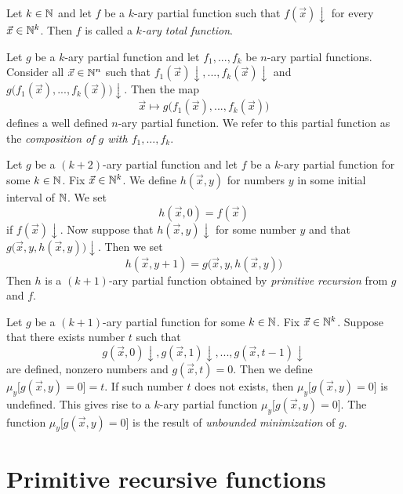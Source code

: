 \documentclass[10pt]{amsart}
\begin{document}
\begin{definition}
	Let $k\in {\mathbb N}$ and let $f$ be a $k$-ary partial function such that $f(\vec{x})\downarrow$ for every $\vec{x} \in {\mathbb N}^k$. Then $f$ is called a \textit{$k$-ary total function}.
\end{definition}

\begin{definition}
	Let $g$ be a $k$-ary partial function and let $f_1,...,f_k$ be $n$-ary partial functions. Consider all $\vec{x} \in {\mathbb N}^n$ such that $f_1(\vec{x})\downarrow,...,f_k(\vec{x})\downarrow$ and $g\big(f_1(\vec{x}),...,f_k(\vec{x})\big)\downarrow$. Then the map
	$$\vec{x} \mapsto g\big(f_1(\vec{x}),...,f_k(\vec{x})\big)$$
	defines a well defined $n$-ary partial function. We refer to this partial function as the \textit{composition of $g$ with $f_1,...,f_k$}.
\end{definition}

\begin{definition}
	Let $g$ be a $(k + 2)$-ary partial function and let $f$ be a $k$-ary partial function for some $k \in {\mathbb N}$. Fix $\vec{x} \in {\mathbb N}^k$. We define $h(\vec{x},y)$ for numbers $y$ in some initial interval of ${\mathbb N}$. We set
	$$h(\vec{x},0) = f(\vec{x})$$
	if $f(\vec{x})\downarrow$. Now suppose that $h(\vec{x},y)\downarrow$ for some number $y$ and that $g\big(\vec{x}, y, h\left(\vec{x},y\right)\big)\downarrow$. Then we set
	$$h(\vec{x}, y + 1) = g\big(\vec{x}, y, h\left(\vec{x},y\right)\big)$$
	Then $h$ is a $(k+1)$-ary partial function obtained by \textit{primitive recursion} from $g$ and $f$.
\end{definition}

\begin{definition}
	Let $g$ be a $(k + 1)$-ary partial function for some $k \in {\mathbb N}$. Fix $\vec{x} \in {\mathbb N}^k$. Suppose that there exists number $t$ such that
	$$g\left(\vec{x},0\right)\downarrow,g\left(\vec{x},1\right)\downarrow,...,g\left(\vec{x},t - 1\right)\downarrow$$
	are defined, nonzero numbers and $g(\vec{x},t) = 0$. Then we define $\mu_y \big[g\left(\vec{x},y\right) = 0\big] = t$. If such number $t$ does not exists, then $\mu_y \big[g\left(\vec{x},y\right) = 0\big]$ is undefined. This gives rise to a $k$-ary partial function $\mu_y \big[g(\vec{x}, y) = 0\big]$. The function $\mu_y \big[g(\vec{x}, y) = 0\big]$ is the result of \textit{unbounded minimization} of $g$.
\end{definition}

\section{Primitive recursive functions}
\end{document}
